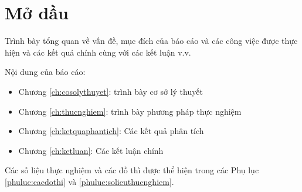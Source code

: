 \chapter*{Mở dầu}


Trình bày tổng quan về vấn đề, mục đích của báo cáo và các công việc được thực hiện và các kết quả chính cùng với các kết luận v.v. 

Nội dung của báo cáo: 

\begin{itemize}
\item Chương \ref{ch:cosolythuyet}: trình bày cơ sở lý thuyết
\item Chương \ref{ch:thucnghiem}: trình bày phương pháp thực nghiệm
\item Chương \ref{ch:ketquaphantich}: Các kết quả phân tích
\item Chương \ref{ch:ketluan}: Các kết luận chính
\end{itemize}

Các số liệu thực nghiệm và các đồ thì được thể hiện trong các Phụ lục \ref{phuluc:cacdothi} và \ref{phuluc:solieuthucnghiem}.
